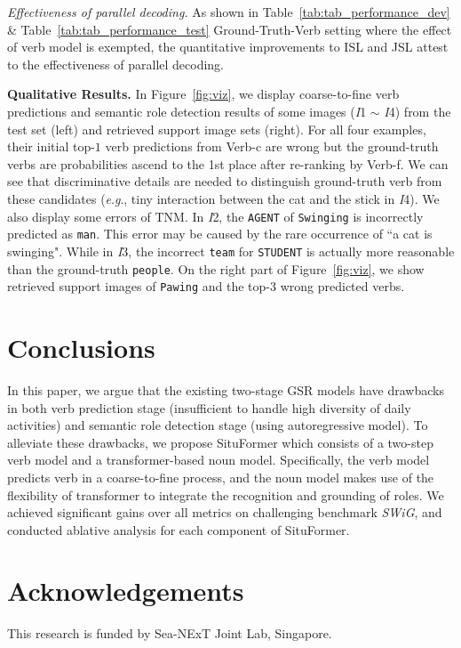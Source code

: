 \documentclass[letterpaper]{article} \usepackage{aaai22}  \usepackage{times}  \usepackage{helvet}  \usepackage{courier}  \usepackage[hyphens]{url}  \usepackage{graphicx} \urlstyle{rm} \def\UrlFont{\rm}  \usepackage{natbib}  \usepackage{caption} \DeclareCaptionStyle{ruled}{labelfont=normalfont,labelsep=colon,strut=off} \frenchspacing  \setlength{\pdfpagewidth}{8.5in}  \setlength{\pdfpageheight}{11in}
\newcommand{\eg}{\textit{e}.\textit{g}.}
\begin{document}
\noindent\emph{Effectiveness of parallel decoding.} As shown in Table~\ref{tab:tab_performance_dev} \& Table~\ref{tab:tab_performance_test} Ground-Truth-Verb setting where the effect of verb model is exempted, the quantitative improvements to ISL and JSL attest to the effectiveness of parallel decoding.

\noindent\textbf{Qualitative Results.}
In Figure~\ref{fig:viz}, we display coarse-to-fine verb predictions and semantic role detection results of some images (\textit{I}1 
$\sim$ \textit{I}4) from the test set (left) and retrieved support image sets (right). For all four examples, their initial top-$1$ verb predictions from Verb-c are wrong but the ground-truth verbs are probabilities ascend to the 1st place after re-ranking by Verb-f. 
We can see that discriminative details are needed to distinguish ground-truth verb from these candidates (\eg, tiny interaction between the cat and the stick in \textit{I}4).
We also display some errors of TNM.
In \textit{I}2, the \texttt{AGENT} of \texttt{Swinging} is incorrectly predicted as \texttt{man}. This error may be caused by the rare occurrence of ``a cat is swinging".
While in \textit{I}3, the incorrect \texttt{team} for \texttt{STUDENT} is actually more reasonable than the ground-truth \texttt{people}. On the right part of Figure~\ref{fig:viz}, we show retrieved support images of \texttt{Pawing} and the top-3 wrong predicted verbs.









\section{Conclusions}
In this paper, we argue that the existing two-stage GSR models have drawbacks in both verb prediction stage (insufficient to handle high diversity of daily activities) and semantic role detection stage (using autoregressive model). To alleviate these drawbacks, we propose 
SituFormer which consists of a two-step verb model and a transformer-based noun model. Specifically, the verb model predicts verb in a coarse-to-fine process, and the noun model makes use of the flexibility of transformer to integrate the recognition and grounding of roles. We achieved significant gains over all metrics on challenging benchmark \textit{SWiG}, and conducted ablative analysis for each component of SituFormer.


\section{Acknowledgements}
This research is funded by Sea-NExT Joint Lab, Singapore.



\end{document}

